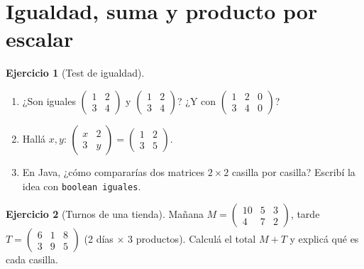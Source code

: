 \documentclass[a4paper,12pt]{article}
\theoremstyle{definition}
\newtheorem{ejercicio}{Ejercicio}[section]
\begin{document}
\section{Igualdad, suma y producto por escalar}
\begin{ejercicio}[Test de igualdad]
\begin{enumerate}[label=\alph*)]
\item ¿Son iguales $\begin{pmatrix} 1 & 2 \\ 3 & 4 \end{pmatrix}$ y $\begin{pmatrix} 1 & 2 \\ 3 & 4 \end{pmatrix}$? ¿Y con $\begin{pmatrix} 1 & 2 & 0 \\ 3 & 4 & 0 \end{pmatrix}$?
\item Hallá $x,y$: $\begin{pmatrix} x & 2 \\ 3 & y \end{pmatrix} = \begin{pmatrix} 1 & 2 \\ 3 & 5 \end{pmatrix}$.
\item En Java, ¿cómo compararías dos matrices $2 \times 2$ casilla por casilla? Escribí la idea con \texttt{boolean iguales}.
\end{enumerate}
\end{ejercicio}

\begin{ejercicio}[Turnos de una tienda]
Mañana $M = \begin{pmatrix} 10 & 5 & 3 \\ 4 & 7 & 2 \end{pmatrix}$, tarde $T = \begin{pmatrix} 6 & 1 & 8 \\ 3 & 9 & 5 \end{pmatrix}$ (2 días $\times$ 3 productos). Calculá el total $M+T$ y explicá qué es cada casilla.
\end{ejercicio}
\end{document}

